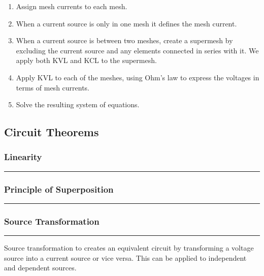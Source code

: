 \documentclass{article}
\begin{document}
    \begin{enumerate}
        \item Assign mesh currents to each mesh.
        \item When a current source is only in one mesh it defines the mesh current.
        \item When a current source is between two meshes, create a supermesh by excluding the current source and any elements connected in series with it.
        We apply both KVL and KCL to the supermesh.
        \item Apply KVL to each of the meshes, using Ohm's law to express the voltages in terms of mesh currents.
        \item Solve the resulting system of equations.
    \end{enumerate}

    \pagebreak
    \begin{center}
        \subsection*{Circuit Theorems}
    \end{center}

    \medskip
    \subsubsection*{Linearity}
    \vspace{-1em}
    \rule{\linewidth}{0.1mm}

    \smallskip
    \subsubsection*{Principle of Superposition}
    \vspace{-1em}
    \rule{\linewidth}{0.1mm}

    \smallskip
    \subsubsection*{Source Transformation}
    \vspace{-1em}
    \rule{\linewidth}{0.1mm}

    \smallskip\noindent
    Source transformation to creates an equivalent circuit by transforming a voltage source into a current source or vice versa.
    This can be applied to independent and dependent sources.
\end{document}
